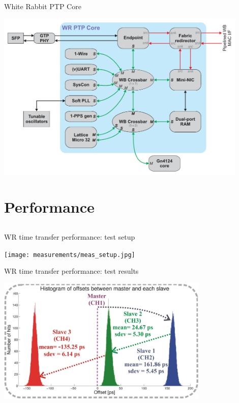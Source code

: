 \documentclass[compress, red]{beamer}
\begin{document}
\begin{frame}{White Rabbit PTP Core}
 \begin{center}
   \includegraphics[width=0.9\textwidth]{node/wrpc_inside.pdf}
   \end{center}
\end{frame}


\section{Performance}
\subsection{}
\begin{frame}{WR time transfer performance: test setup}

    \begin{center}
    \texttt{[image: measurements/meas\_setup.jpg]}
    \end{center}

\end{frame}

\begin{frame}{WR time transfer performance: test results}

    \begin{center}
    \includegraphics[height=6.0cm]{measurements/meas_results2.pdf}
    \end{center}

\end{frame}
\end{document}
